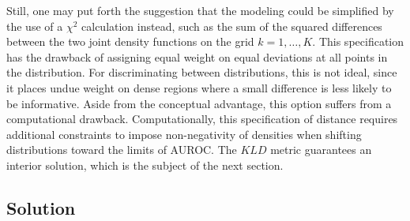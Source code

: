 Still, one may put forth the suggestion that the modeling could be simplified by the use of a $\chi^2$ calculation instead, such as
%
%
%
the sum of the squared differences between the two joint density functions on the grid $k = 1, \dots, K$.
% 
This specification has the drawback of assigning equal weight on equal deviations at all points in the distribution.
For discriminating between distributions, this is not ideal, since it places undue weight on dense regions where a small difference is less likely to be informative.
%
Aside from the conceptual advantage, this option suffers from a computational drawback.
Computationally, this specification of distance requires additional constraints to impose non-negativity of densities when shifting distributions toward the limits of AUROC.
The $KLD$ metric guarantees an interior solution, which is the subject of the next section.








\subsection{Solution}

